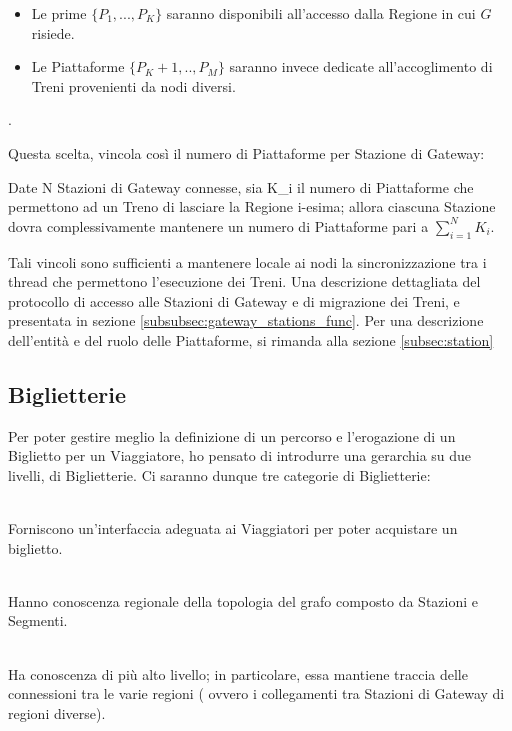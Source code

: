 		\begin{itemize}
			\item Le prime $\{P_1,...,P_K\}$ saranno disponibili all'accesso dalla Regione in cui $G$ risiede.
			\item Le Piattaforme $\{P_K+1,..,P_M\}$ saranno invece dedicate all'accoglimento di Treni provenienti da nodi diversi.
		\end{itemize}.
	
	Questa scelta, vincola così il numero di Piattaforme per Stazione di Gateway: 
	
	\begin{consequence}
	Date N Stazioni di Gateway connesse, sia K\_i il numero di Piattaforme che permettono ad un Treno di lasciare la Regione i-esima; allora ciascuna Stazione dovra complessivamente mantenere un numero di Piattaforme pari a $\sum_{i = 1}^{N}{K_i}$.
	\end{consequence}
	
	 Tali vincoli sono sufficienti a mantenere locale ai nodi la sincronizzazione tra i thread che permettono l'esecuzione dei Treni. Una descrizione dettagliata del protocollo di accesso alle Stazioni di Gateway e di migrazione dei Treni, e presentata in sezione \ref{subsubsec:gateway_stations_func}.
	Per una descrizione dell'entità e del ruolo delle Piattaforme, si rimanda alla sezione \ref{subsec:station}


	\subsection{Biglietterie}
	
	Per poter gestire meglio la definizione di un percorso e l'erogazione di un Biglietto per un Viaggiatore, ho pensato di introdurre una gerarchia su due livelli, di Biglietterie. Ci saranno dunque tre categorie di Biglietterie:
		\begin{description}
			\item {} \\
			Forniscono un'interfaccia adeguata ai Viaggiatori per poter acquistare un biglietto.
			\item {}\\
			Hanno conoscenza regionale della topologia del grafo composto da Stazioni e Segmenti.
			\item {} \\ 
			Ha conoscenza di più alto livello; in particolare, essa mantiene traccia delle connessioni tra le varie regioni ( ovvero i collegamenti tra Stazioni di Gateway di regioni diverse).
		\end{description} 
	
